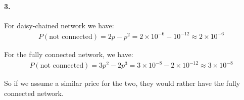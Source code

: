 \paragraph{3.} For daisy-chained network we have:
\begin{align*}
P(\textrm{not connected}) = 2p - p^2 = 2 \times 10^{-6} - 10^{-12} \approx 2 \times 10^{-6}
\end{align*}

For the fully connected network, we have:
\begin{align*}
P(\textrm{not connected}) = 3p^2 - 2p^3 = 3 \times 10^{-8} - 2 \times 10^{-12} \approx 3 \times 10^{-8}
\end{align*}

So if we assume a similar price for the two, they would rather have the fully connected network.
